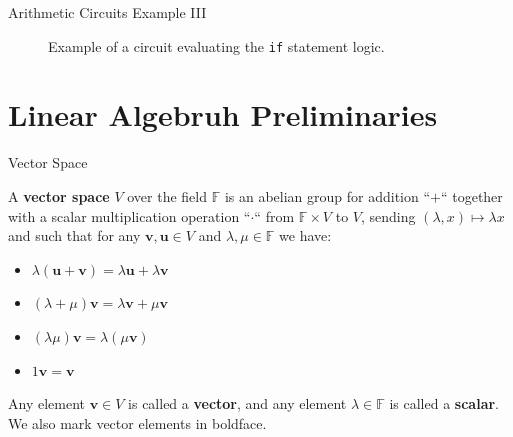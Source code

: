 \documentclass{zkdl-presentation-template}
\begin{document}
\begin{frame}[fragile]{Arithmetic Circuits Example III}
\begin{figure}[h!]
            \caption{Example of a circuit evaluating the \texttt{if} statement logic.}
            \label{fig:multivariate-polynomial-circuit}
        \end{figure}
    \end{frame}

    \section{Linear Algebruh Preliminaries}

    \begin{frame}{Vector Space}
        \begin{definition}
            A \textbf{vector space} $V$ over the field $\mathbb{F}$ is an abelian group for addition
            ``$+$`` together with a scalar multiplication operation ``$\cdot$`` from $\mathbb{F} \times V$
            to $V$, sending $(\lambda,x) \mapsto \lambda x$ and such that for any 
            $\mathbf{v},\mathbf{u} \in V$ and $\lambda,\mu \in \mathbb{F}$ we have:
            \begin{itemize}
                \item $\lambda(\mathbf{u}+\mathbf{v}) = \lambda \mathbf{u} + \lambda \mathbf{v}$
                \item $(\lambda + \mu)\mathbf{v} = \lambda \mathbf{v} + \mu \mathbf{v}$
                \item $(\lambda \mu)\mathbf{v} = \lambda(\mu \mathbf{v})$
                \item $1\mathbf{v} = \mathbf{v}$
            \end{itemize}

            Any element $\mathbf{v} \in V$ is called a \textbf{vector}, and any element
            $\lambda \in \mathbb{F}$ is called a \textbf{scalar}. We also mark vector elements in 
            boldface.
        \end{definition}
    \end{frame}
\end{document}
